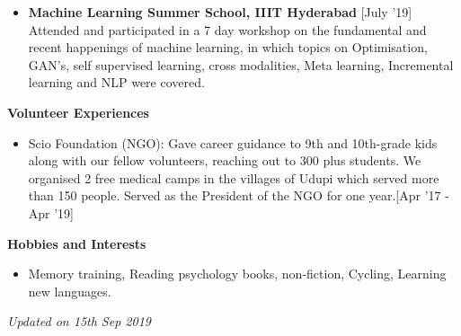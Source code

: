 \documentclass[a4paper,10pt]{article}
\begin{document}
\begin{itemize}
  \setlength{\itemsep}{1pt}
  \item \textbf{Machine Learning Summer School, IIIT Hyderabad}
  \hfill {\small{{[July '19]}}\/} 
  \\
  Attended and participated in a 7 day workshop on the fundamental and recent happenings
  of machine learning, in which topics on Optimisation, GAN's, self supervised learning, cross modalities, Meta learning, Incremental learning and NLP were covered.

\end{itemize}




%
%

\colorbox{titleColor}{\parbox{6.7in}{\textbf{Volunteer Experiences}}}

\begin{itemize}
  \setlength{\itemsep}{1pt}
  \item Scio Foundation (NGO):
  Gave career guidance to 9th and 10th-grade kids along with our fellow volunteers, reaching out to 300 plus students. We organised 2 free medical camps in the villages of Udupi which served more than 150 people. Served as the President of the NGO for one year.\hfill {\small{{[Apr '17 - Apr '19]}}\/} 
\end{itemize}

\colorbox{titleColor}{\parbox{6.7in}{\textbf{Hobbies and Interests}}}

\begin{itemize}
  \setlength{\itemsep}{1pt}
  \item Memory training, Reading psychology books, non-fiction, Cycling, Learning new languages.
\end{itemize}

\textit{Updated on 15th Sep 2019}
\end{document}
